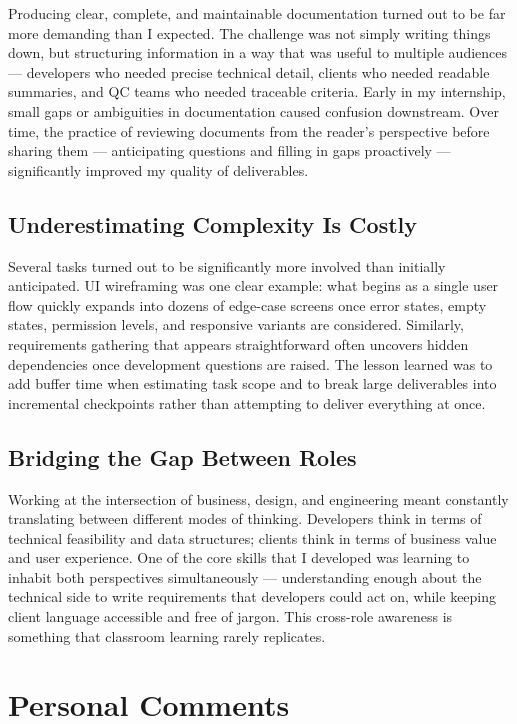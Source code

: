 Producing clear, complete, and maintainable documentation turned out to be far more demanding than I expected. The challenge was not simply writing things down, but structuring information in a way that was useful to multiple audiences — developers who needed precise technical detail, clients who needed readable summaries, and QC teams who needed traceable criteria. Early in my internship, small gaps or ambiguities in documentation caused confusion downstream. Over time, the practice of reviewing documents from the reader's perspective before sharing them — anticipating questions and filling in gaps proactively — significantly improved my quality of deliverables.

\subsection{Underestimating Complexity Is Costly}

Several tasks turned out to be significantly more involved than initially anticipated. UI wireframing was one clear example: what begins as a single user flow quickly expands into dozens of edge-case screens once error states, empty states, permission levels, and responsive variants are considered. Similarly, requirements gathering that appears straightforward often uncovers hidden dependencies once development questions are raised. The lesson learned was to add buffer time when estimating task scope and to break large deliverables into incremental checkpoints rather than attempting to deliver everything at once.

\subsection{Bridging the Gap Between Roles}

Working at the intersection of business, design, and engineering meant constantly translating between different modes of thinking. Developers think in terms of technical feasibility and data structures; clients think in terms of business value and user experience. One of the core skills that I developed was learning to inhabit both perspectives simultaneously — understanding enough about the technical side to write requirements that developers could act on, while keeping client language accessible and free of jargon. This cross-role awareness is something that classroom learning rarely replicates.

\section{Personal Comments}

